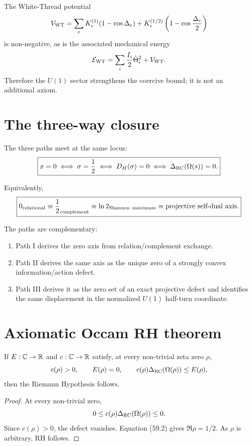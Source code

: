 The White-Thread potential
\[
V_{\rm WT}
=
\sum_e
K_e^{(1)}(1-\cos\Delta_e)
+
K_e^{(1/2)}
\left(1-\cos\frac{\Delta_e}{2}\right)
\]
is non-negative, as is the associated mechanical energy
\[
\mathcal E_{\rm WT}
=
\sum_i\frac{I_i}{2}\dot\Theta_i^2
+
V_{\rm WT}.
\]
Therefore the \(U(1)\) sector strengthens the coercive bound; it is not an
additional axiom.

\section{The three-way closure}

The three paths meet at the same locus:
\[
\boxed{
x=0
\iff
\sigma=\frac12
\iff
D_H(\sigma)=0
\iff
\Delta_{\rm RC}(\Omega(s))=0.
}
\]

Equivalently,
\[
\boxed{
0_{\rm relational}
\equiv
\frac12_{\rm complement}
\equiv
\ln2_{\rm Shannon\ maximum}
\equiv
\text{projective self-dual axis}.
}
\]

The paths are complementary:

\begin{enumerate}
  \item Path I derives the zero axis from relation/complement exchange.
  \item Path II derives the same axis as the unique zero of a strongly convex
  information/action defect.
  \item Path III derives it as the zero set of an exact projective defect and
  identifies the same displacement in the normalized \(U(1)\) half-turn
  coordinate.
\end{enumerate}

\section{Axiomatic Occam RH theorem}

\begin{theorem}
If \(E:\mathbb{C}\to\mathbb{R}\) and \(c:\mathbb{C}\to\mathbb{R}\) satisfy, at every non-trivial zeta zero
\(\rho\),
\[
c(\rho)>0,
\qquad
E(\rho)=0,
\qquad
c(\rho)\Delta_{\rm RC}(\Omega(\rho))\le E(\rho),
\]
then the Riemann Hypothesis follows.
\end{theorem}

\begin{proof}
At every non-trivial zero,
\[
0
\le
c(\rho)\Delta_{\rm RC}(\Omega(\rho))
\le
0.
\]
Since \(c(\rho)>0\), the defect vanishes.  Equation (59.2) gives
\(\Re\rho=1/2\).  As \(\rho\) is arbitrary, RH follows.
\end{proof}

